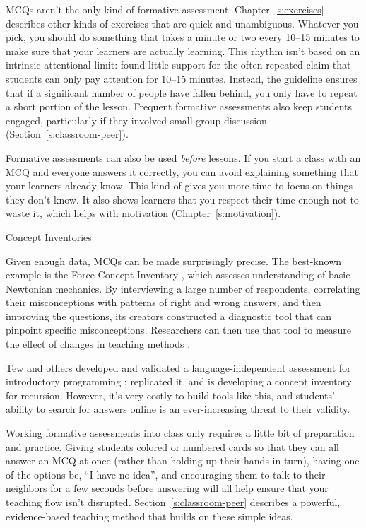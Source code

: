 MCQs aren't the only kind of formative assessment:
Chapter~\ref{s:exercises} describes other kinds of exercises that are quick and unambiguous.
Whatever you pick,
you should do something that takes a minute or two every 10--15 minutes
to make sure that your learners are actually learning.
This rhythm isn't based on an intrinsic attentional limit:
\cite{Wils2007} found little support for the often-repeated claim that
students can only pay attention for 10--15 minutes.
Instead,
the guideline ensures that if a significant number of people have fallen behind,
you only have to repeat a short portion of the lesson.
Frequent formative assessments also keep students engaged,
particularly if they involved small-group discussion
(Section~\ref{s:classroom-peer}).

Formative assessments can also be used \emph{before} lessons.
If you start a class with an MCQ and everyone answers it correctly,
you can avoid explaining something that your learners already know.
This kind of 
gives you more time to focus on things they don't know.
It also shows learners that you respect their time enough not to waste it,
which helps with motivation (Chapter~\ref{s:motivation}).

\begin{aside}{Concept Inventories}

  Given enough data,
  MCQs can be made surprisingly precise.
  The best-known example is the Force Concept Inventory \cite{Hest1992},
  which assesses understanding of basic Newtonian mechanics.
  By interviewing a large number of respondents,
  correlating their misconceptions with patterns of right and wrong answers,
  and then improving the questions,
  its creators constructed a diagnostic tool that can pinpoint specific misconceptions.
  Researchers can then use that tool to measure the effect of changes in teaching methods \cite{Hake1998}.

  Tew and others developed and validated
  a language-independent assessment for introductory programming \cite{Tew2011};
  \cite{Park2016} replicated it,
  and \cite{Hamo2017} is developing a concept inventory for recursion.
  However,
  it's very costly to build tools like this,
  and students' ability to search for answers online is an ever-increasing threat to their validity.

\end{aside}

Working formative assessments into class only requires a little bit of preparation and practice.
Giving students colored or numbered cards so that they can all answer an MCQ at once
(rather than holding up their hands in turn),
having one of the options be, ``I have no idea'',
and encouraging them to talk to their neighbors for a few seconds before answering
will all help ensure that your teaching flow isn't disrupted.
Section~\ref{s:classroom-peer} describes a powerful,
evidence-based teaching method that builds on these simple ideas.


